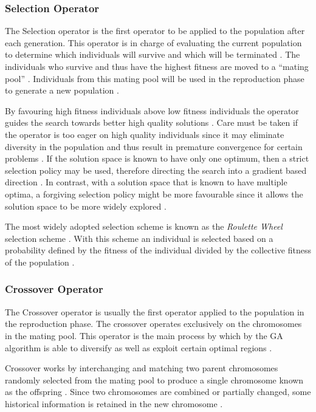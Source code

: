 \subsubsection{Selection Operator}
The Selection operator is the first operator to be applied to the population after each generation. This operator is in charge of evaluating the current population to determine which individuals will survive and which will be terminated \cite{CoactiveFuzzyGA,CombinedBranchBoundGA,ConstrainedGA}. The individuals who survive and thus have the highest fitness are moved to a ``mating pool'' \cite{HumanPassiveGA}. Individuals from this mating pool will be used in the reproduction phase to generate a new population \cite{AdaptiveSAGA,AcceleratingGA}.

By favouring high fitness individuals above low fitness individuals the operator guides the search towards better high quality solutions \cite{ConstrainedGA}. Care must be taken if the operator is too eager on high quality individuals since it may eliminate diversity in the population and thus result in premature convergence for certain problems \cite{ConstrainedGA}. If the solution space is known to have only one optimum, then a strict selection policy may be used, therefore directing the search into a gradient based direction \cite{ConstrainedGA}. In contrast, with a solution space that is known to have multiple optima, a forgiving selection policy might be more favourable since it allows the solution space to be more widely explored \cite{ConstrainedGA}.

The most widely adopted selection scheme is known as the \emph{Roulette Wheel} selection scheme \cite{ConstrainedGA,GeostatisticalGA,HybridBaldwinGA,CoactiveFuzzyGA}. With this scheme an individual is selected based on a probability defined by the fitness of the individual divided by the collective fitness of the population \cite{GeostatisticalGA}.
\subsubsection{Crossover Operator}
\label{sec:crossover}
The Crossover operator is usually the first operator applied to the population in the reproduction phase. The crossover operates exclusively on the chromosomes in the mating pool. This operator is the main process by which by the GA algorithm is able to diversify as well as exploit certain optimal regions \cite{CombinedBranchBoundGA,CoactiveFuzzyGA}. 

Crossover works by interchanging and matching two parent chromosomes randomly selected from the mating pool to produce a single chromosome known as the offspring \cite{FamilyGA,HumanPassiveGA,CoactiveFuzzyGA}. Since two chromosomes are combined or partially changed, some historical information is retained in the new chromosome \cite{FamilyGA}.

